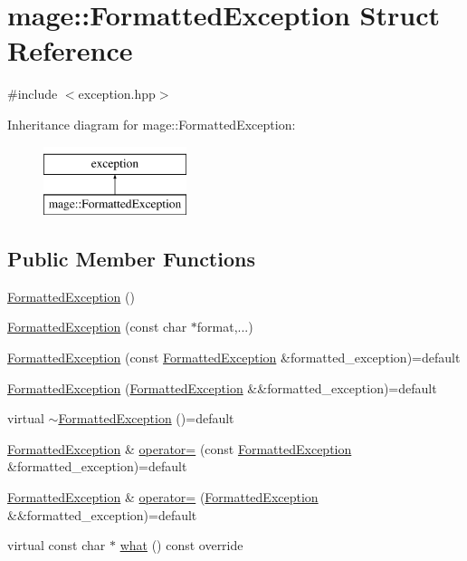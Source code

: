 \hypertarget{structmage_1_1_formatted_exception}{}\section{mage\+:\+:Formatted\+Exception Struct Reference}
\label{structmage_1_1_formatted_exception}


{\ttfamily \#include $<$exception.\+hpp$>$}

Inheritance diagram for mage\+:\+:Formatted\+Exception\+:\begin{figure}[H]
\begin{center}
\leavevmode
\includegraphics[height=2.000000cm]{structmage_1_1_formatted_exception}
\end{center}
\end{figure}
\subsection*{Public Member Functions}
\begin{DoxyCompactItemize}
\item 
\hyperlink{structmage_1_1_formatted_exception_a77b82a969ec33a3aacec74a5adc4ab8b}{Formatted\+Exception} ()
\item 
\hyperlink{structmage_1_1_formatted_exception_a3fe833a49052a2db99c023b1b1d43621}{Formatted\+Exception} (const char $\ast$format,...)
\item 
\hyperlink{structmage_1_1_formatted_exception_ac42aa4b8dcd15a4f88fc578fec5b11db}{Formatted\+Exception} (const \hyperlink{structmage_1_1_formatted_exception}{Formatted\+Exception} \&formatted\+\_\+exception)=default
\item 
\hyperlink{structmage_1_1_formatted_exception_ac47ff28101bb2660f40211d47afd6bf9}{Formatted\+Exception} (\hyperlink{structmage_1_1_formatted_exception}{Formatted\+Exception} \&\&formatted\+\_\+exception)=default
\item 
virtual \hyperlink{structmage_1_1_formatted_exception_a074a2e845b0fa0d57dfeab63ee0cb1f5}{$\sim$\+Formatted\+Exception} ()=default
\item 
\hyperlink{structmage_1_1_formatted_exception}{Formatted\+Exception} \& \hyperlink{structmage_1_1_formatted_exception_a36b95a1d6ee656db750f9f7c24a0f69d}{operator=} (const \hyperlink{structmage_1_1_formatted_exception}{Formatted\+Exception} \&formatted\+\_\+exception)=default
\item 
\hyperlink{structmage_1_1_formatted_exception}{Formatted\+Exception} \& \hyperlink{structmage_1_1_formatted_exception_ae35ad9e81efe8ed385792854036b4a14}{operator=} (\hyperlink{structmage_1_1_formatted_exception}{Formatted\+Exception} \&\&formatted\+\_\+exception)=default
\item 
virtual const char $\ast$ \hyperlink{structmage_1_1_formatted_exception_af4a63770e4f7091868d9e1e2382c1e70}{what} () const override
\end{DoxyCompactItemize}
